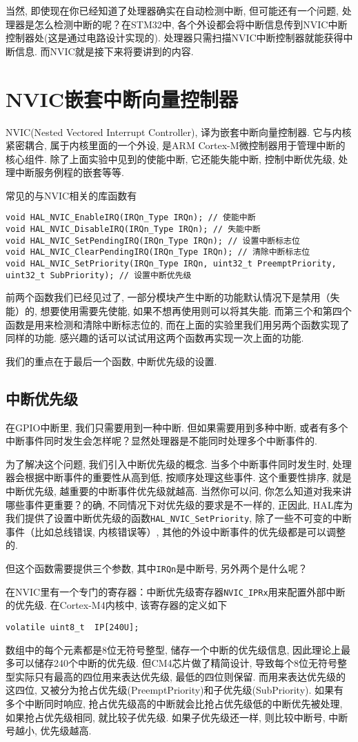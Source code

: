 当然, 即使现在你已经知道了处理器确实在自动检测中断, 但可能还有一个问题, 处理器是怎么检测中断的呢？在STM32中, 各个外设都会将中断信息传到NVIC中断控制器处(这是通过电路设计实现的).
处理器只需扫描NVIC中断控制器就能获得中断信息. 而NVIC就是接下来将要讲到的内容.

\section{NVIC嵌套中断向量控制器}
NVIC(Nested Vectored Interrupt Controller), 译为嵌套中断向量控制器. 它与内核紧密耦合, 属于内核里面的一个外设, 是ARM Cortex-M微控制器用于管理中断的核心组件. 除了上面实验中见到的使能中断, 它还能失能中断, 控制中断优先级, 处理中断服务例程的嵌套等等.

常见的与NVIC相关的库函数有
\begin{lstlisting}
void HAL_NVIC_EnableIRQ(IRQn_Type IRQn); // 使能中断
void HAL_NVIC_DisableIRQ(IRQn_Type IRQn); // 失能中断
void HAL_NVIC_SetPendingIRQ(IRQn_Type IRQn); // 设置中断标志位
void HAL_NVIC_ClearPendingIRQ(IRQn_Type IRQn); // 清除中断标志位
void HAL_NVIC_SetPriority(IRQn_Type IRQn, uint32_t PreemptPriority, uint32_t SubPriority); // 设置中断优先级
\end{lstlisting}
前两个函数我们已经见过了, 一部分模块产生中断的功能默认情况下是禁用（失能）的, 想要使用需要先使能, 如果不想再使用则可以将其失能. 而第三个和第四个函数是用来检测和清除中断标志位的, 而在上面的实验里我们用另两个函数实现了同样的功能. 感兴趣的话可以试试用这两个函数再实现一次上面的功能.

我们的重点在于最后一个函数, 中断优先级的设置.
\subsection{中断优先级}
在GPIO中断里, 我们只需要用到一种中断. 但如果需要用到多种中断, 或者有多个中断事件同时发生会怎样呢？显然处理器是不能同时处理多个中断事件的.

为了解决这个问题, 我们引入中断优先级的概念. 当多个中断事件同时发生时, 处理器会根据中断事件的重要性从高到低, 按顺序处理这些事件. 这个重要性排序, 就是中断优先级, 越重要的中断事件优先级就越高.
当然你可以问, 你怎么知道对我来讲哪些事件更重要？的确, 不同情况下对优先级的要求是不一样的, 正因此, HAL库为我们提供了设置中断优先级的函数\verb|HAL_NVIC_SetPriority|, 除了一些不可变的中断事件（比如总线错误, 内核错误等）, 其他的外设中断事件的优先级都是可以调整的.

但这个函数需要提供三个参数, 其中\verb|IRQn|是中断号, 另外两个是什么呢？

在NVIC里有一个专门的寄存器：中断优先级寄存器\verb|NVIC_IPRx|用来配置外部中断的优先级. 在Cortex-M4内核中, 该寄存器的定义如下
\begin{lstlisting}
volatile uint8_t  IP[240U];
\end{lstlisting}
数组中的每个元素都是8位无符号整型, 储存一个中断的优先级信息, 因此理论上最多可以储存240个中断的优先级. 但CM4芯片做了精简设计, 导致每个8位无符号整型实际只有最高的四位用来表达优先级, 最低的四位则保留.
而用来表达优先级的这四位, 又被分为抢占优先级(PreemptPriority)和子优先级(SubPriority). 如果有多个中断同时响应, 抢占优先级高的中断就会比抢占优先级低的中断优先被处理, 如果抢占优先级相同, 就比较子优先级.
如果子优先级还一样, 则比较中断号, 中断号越小, 优先级越高.

